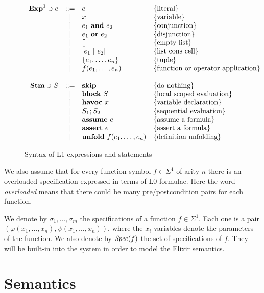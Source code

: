 \begin{figure}
\[
\begin{array}{rcll}
\mathbf{Exp}^{1} \ni e & ::= & c & \{ \textrm{literal} \}\\
& | & x & \{ \textrm{variable} \}\\
& | & e_1~\textbf{and}~e_2 & \{ \textrm{conjunction} \}\\
& | & e_1~\textbf{or}~e_2 & \{ \textrm{disjunction} \}\\
& | & [] & \{ \textrm{empty list} \}\\
& | & [e_1~|~e_2] & \{ \textrm{list cons cell} \}\\
& | & \{e_1, \ldots, e_n\} & \{ \textrm{tuple} \}\\
& | & f(e_1, \ldots, e_n) & \{ \textrm{function or operator application} \}\\

\\
\mathbf{Stm} \ni S & ::= & \textbf{skip} & \{ \textrm{do nothing} \} \\
 & | & \textbf{block}~S & \{ \textrm{local scoped evaluation} \}\\
 & | & \textbf{havoc}~x & \{ \textrm{variable declaration} \}\\
 & | & S_1;S_2 & \{ \textrm{sequential evaluation} \}\\
 & | & \textbf{assume}~e & \{ \textrm{assume a formula} \}\\
 & | & \textbf{assert}~e & \{ \textrm{assert a formula} \}\\
 & | & \textbf{unfold}~f(e_1, \dots, e_n) & \{ \textrm{definition unfolding} \}\\
\end{array}
\]
\caption{Syntax of L1 expressions and statements}
\label{fig:l1syn}
\end{figure}

We also assume that for every function symbol $f \in \Sigma^{1}$ of arity $n$
there is an overloaded specification expressed in terms of L0 formulae. Here the
word \emph{overloaded} means that there could be many pre/postcondition pairs
for each function.

We denote by $\sigma_1, \ldots, \sigma_m$ the specifications of a function $f
\in \Sigma^{1}$. Each one is a pair $(\varphi(x_1, \ldots, x_n), \psi(x_1,
\ldots, x_n))$, where the $x_i$ variables denote the parameters of the function.
We also denote by $\mathit{Spec}(f)$ the set of specifications of $f$. They will be
built-in into the system in order to model the Elixir semantics.

\section{Semantics}

